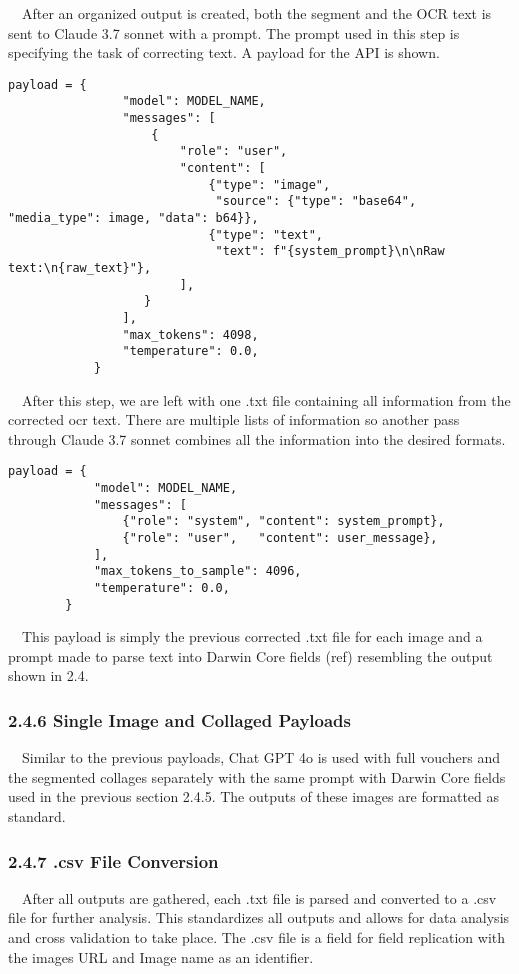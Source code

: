 \documentclass{article}
\begin{document}
$\quad$After an organized output is created, both the segment and the OCR text is sent to Claude 3.7 sonnet with a prompt. The prompt used in this step is specifying the task of correcting text.  A payload for the API is shown.
\begingroup\footnotesize
\begin{verbatim}
payload = {
                "model": MODEL_NAME,
                "messages": [
                    {
                        "role": "user",
                        "content": [
                            {"type": "image",
                             "source": {"type": "base64", "media_type": image, "data": b64}},
                            {"type": "text",
                             "text": f"{system_prompt}\n\nRaw text:\n{raw_text}"},
                        ],
                   }
                ],
                "max_tokens": 4098,
                "temperature": 0.0,
            }
\end{verbatim}
\endgroup

$\quad$After this step, we are left with one .txt file containing all information from the corrected ocr text. There are multiple lists of information so another pass through Claude 3.7 sonnet combines all the information into the desired formats. 
\begingroup\footnotesize
\begin{verbatim}
payload = {
            "model": MODEL_NAME,
            "messages": [
                {"role": "system", "content": system_prompt},
                {"role": "user",   "content": user_message},
            ],
            "max_tokens_to_sample": 4096,
            "temperature": 0.0,
        }
\end{verbatim}
\endgroup

$\quad$This payload is simply the previous corrected .txt file for each image and a prompt made to parse text into Darwin Core fields (ref) resembling the output shown in 2.4. 

\subsubsection*{2.4.6 Single Image and Collaged Payloads}
$\quad$Similar to the previous payloads, Chat GPT 4o is used with full vouchers and the segmented collages separately with the same prompt with Darwin Core fields used in the previous section 2.4.5. The outputs of these images are formatted as standard.

\subsubsection*{2.4.7 .csv File Conversion}
$\quad$After all outputs are gathered, each .txt file is parsed and converted to a .csv file for further analysis. This standardizes all outputs and allows for data analysis and cross validation to take place. The .csv file is a field for field replication with the images URL and Image name as an identifier. 
\end{document}
